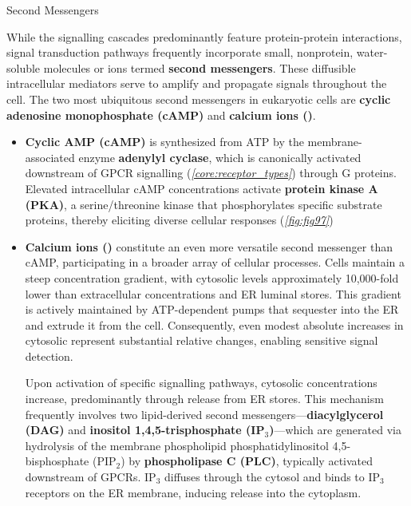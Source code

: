 \documentclass[10pt]{article}
\begin{document}
      \begin{core}[label=core:second_messengers]{Second Messengers}

        While the signalling cascades predominantly feature protein-protein interactions, signal transduction pathways frequently incorporate small, nonprotein, water-soluble molecules or ions termed \textbf{second messengers}. These diffusible intracellular mediators serve to amplify and propagate signals throughout the cell. The two most ubiquitous second messengers in eukaryotic cells are \textbf{cyclic adenosine monophosphate (cAMP)} and \textbf{calcium ions ()}.

        \begin{itemize}

          \item \textbf{Cyclic AMP (cAMP)} is synthesized from ATP by the membrane-associated enzyme \textbf{adenylyl cyclase}, which is canonically activated downstream of GPCR signalling (\textit{\autoref{core:receptor_types}}) through G proteins. Elevated intracellular cAMP concentrations activate \textbf{protein kinase A (PKA)}, a serine/threonine kinase that phosphorylates specific substrate proteins, thereby eliciting diverse cellular responses (\textit{\autoref{fig:fig97}})


          \item \textbf{Calcium ions ()} constitute an even more versatile second messenger than cAMP, participating in a broader array of cellular processes. Cells maintain a steep  concentration gradient, with cytosolic levels approximately 10,000-fold lower than extracellular concentrations and ER luminal stores. This gradient is actively maintained by ATP-dependent  pumps that sequester  into the ER and extrude it from the cell. Consequently, even modest absolute increases in cytosolic  represent substantial relative changes, enabling sensitive signal detection.


          Upon activation of specific signalling pathways, cytosolic  concentrations increase, predominantly through release from ER stores. This mechanism frequently involves two lipid-derived second messengers---\textbf{diacylglycerol (DAG)} and \textbf{inositol 1,4,5-trisphosphate (IP$_3$)}---which are generated via hydrolysis of the membrane phospholipid phosphatidylinositol 4,5-bisphosphate (PIP$_2$) by \textbf{phospholipase C (PLC)}, typically activated downstream of GPCRs. IP$_3$ diffuses through the cytosol and binds to IP$_3$ receptors on the ER membrane, inducing  release into the cytoplasm.

        \end{itemize}

      \end{core}
\end{document}
